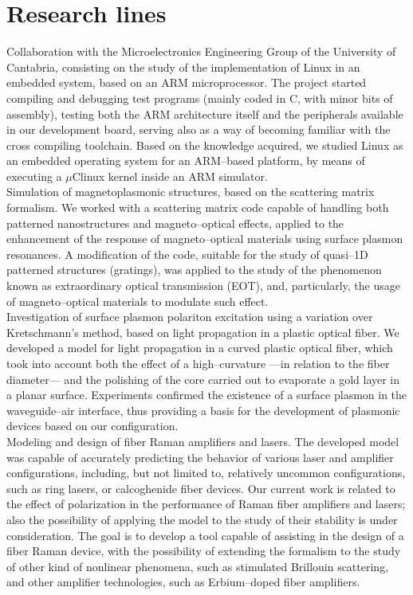 \documentclass[11pt, a4paper]{article}
\newcommand{\years}[1]{\marginnote{\scriptsize #1}}
\begin{document}
\section*{Research lines} %
\noindent
\years{2005--2008}Collaboration with the Microelectronics Engineering Group of the University of Cantabria, consisting on the study of the implementation of Linux in an embedded system, based on an ARM microprocessor. The project started compiling and debugging test programs (mainly coded in C, with minor bits of assembly), testing both the ARM architecture itself and the peripherals available in our development board, serving also as a way of becoming familiar with the cross compiling toolchain. Based on the knowledge acquired, we studied Linux as an embedded operating system for an ARM--based platform, by means of executing a $\mu$Clinux kernel inside an ARM simulator.\\
\years{2008--2009}Simulation of magnetoplasmonic structures, based on the scattering matrix formalism. We worked with a scattering matrix code capable of handling both patterned nanostructures and magneto--optical effects, applied to the enhancement of the response of magneto--optical materials using surface plasmon resonances. A modification of the code, suitable for the study of quasi--1D patterned structures (gratings), was applied to the study of the phenomenon known as extraordinary optical transmission (EOT), and, particularly, the usage of magneto--optical materials to modulate such effect.\\
\years{2009--present}Investigation of surface plasmon polariton excitation using a variation over Kretschmann's method, based on light propagation in a plastic optical fiber. We developed a model for light propagation in a curved plastic optical fiber, which took into account both the effect of a high--curvature ---in relation to the fiber diameter--- and the polishing of the core carried out to evaporate a gold layer in a planar surface. Experiments confirmed the existence of a surface plasmon in the waveguide--air interface, thus providing a basis for the development of plasmonic devices based on our configuration.\\
\years{2010--present}Modeling and design of fiber Raman amplifiers and lasers. The developed model was capable of accurately predicting the behavior of various laser and amplifier configurations, including, but not limited to, relatively uncommon configurations, such as ring lasers, or calcoghenide fiber devices. Our current work is related to the effect of polarization in the performance of Raman fiber amplifiers and lasers; also the possibility of applying the model to the study of their stability is under consideration. The goal is to develop a tool capable of assisting in the design of a fiber Raman device, with the possibility of extending the formalism to the study of other kind of nonlinear phenomena, such as stimulated Brillouin scattering, and other amplifier technologies, such as Erbium--doped fiber amplifiers.
\end{document}
